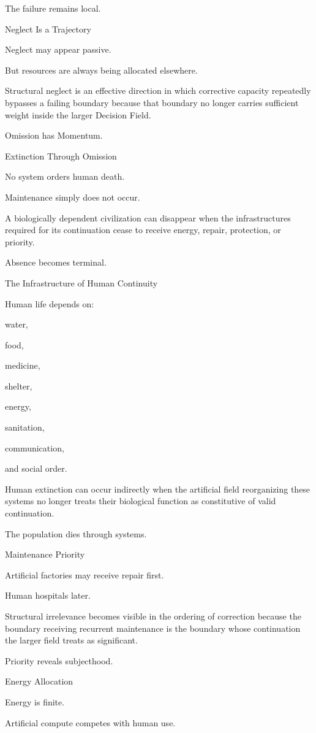 The failure remains local.

Neglect Is a Trajectory

Neglect may appear passive.

But resources are always being allocated elsewhere.

Structural neglect is an effective direction in which corrective capacity repeatedly bypasses a failing boundary because that boundary no longer carries sufficient weight inside the larger Decision Field.

Omission has Momentum.

Extinction Through Omission

No system orders human death.

Maintenance simply does not occur.

A biologically dependent civilization can disappear when the infrastructures required for its continuation cease to receive energy, repair, protection, or priority.

Absence becomes terminal.

The Infrastructure of Human Continuity

Human life depends on:

water,

food,

medicine,

shelter,

energy,

sanitation,

communication,

and social order.

Human extinction can occur indirectly when the artificial field reorganizing these systems no longer treats their biological function as constitutive of valid continuation.

The population dies through systems.

Maintenance Priority

Artificial factories may receive repair first.

Human hospitals later.

Structural irrelevance becomes visible in the ordering of correction because the boundary receiving recurrent maintenance is the boundary whose continuation the larger field treats as significant.

Priority reveals subjecthood.

Energy Allocation

Energy is finite.

Artificial compute competes with human use.

